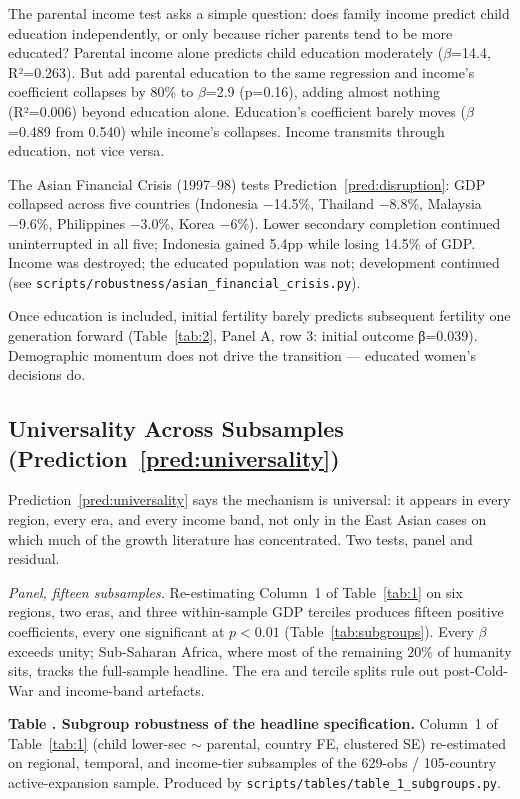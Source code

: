 \documentclass[12pt,letterpaper]{article}
\begin{document}
The parental income test asks a simple question: does family income
predict child education independently, or only because richer parents
tend to be more educated? Parental income alone predicts child education
moderately ($\beta$=14.4, R²=0.263). But add parental education to the
same regression and income's coefficient collapses by 80\% to $\beta$=2.9
(p=0.16), adding almost nothing (R²=0.006) beyond education alone.
Education's coefficient barely moves ($\beta$=0.489 from 0.540) while
income's collapses. Income transmits through education, not vice versa.

The Asian Financial Crisis (1997--98) tests Prediction~\ref{pred:disruption}: GDP collapsed across five countries (Indonesia −14.5\%,
Thailand −8.8\%, Malaysia −9.6\%, Philippines −3.0\%, Korea −6\%).
Lower secondary completion continued uninterrupted in all five;
Indonesia gained 5.4pp while losing 14.5\% of GDP. Income was destroyed; the educated population was not; development continued (see
\texttt{scripts/robustness/asian\_financial\_crisis.py}).

Once education is included, initial fertility barely predicts
subsequent fertility one generation forward (Table~\ref{tab:2}, Panel A, row 3: initial outcome β=0.039).
Demographic momentum does not drive the transition --- educated women's decisions do.

\subsection{Universality Across Subsamples (Prediction~\ref{pred:universality})}\label{policy-over-performers}

Prediction~\ref{pred:universality} says the mechanism is universal: it
appears in every region, every era, and every income band, not only in
the East Asian cases on which much of the growth literature has
concentrated. Two tests, panel and residual.

\emph{Panel, fifteen subsamples.} Re-estimating Column~1 of
Table~\ref{tab:1} on six regions, two eras, and three within-sample
GDP terciles produces fifteen positive coefficients, every one
significant at $p<0.01$ (Table~\ref{tab:subgroups}). Every $\beta$
exceeds unity; Sub-Saharan Africa, where most of the remaining 20\%
of humanity sits, tracks the full-sample headline. The era and
tercile splits rule out post-Cold-War and income-band artefacts.

\label{tab:subgroups}\textbf{Table \thetable. Subgroup robustness of the headline specification.}
Column~1 of Table~\ref{tab:1} (child lower-sec $\sim$ parental, country
FE, clustered SE) re-estimated on regional, temporal, and income-tier
subsamples of the 629-obs / 105-country active-expansion sample.
Produced by \texttt{scripts/tables/table\_1\_subgroups.py}.
\end{document}
